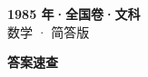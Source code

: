 \documentclass[zihao=-4, a4paper]{ctexart}
\begin{document}
\begin{center}
  {\Large\bfseries 1985 年·全国卷·文科}\\[4pt]
  {\large 数学 · 简答版}
\end{center}
\medskip
{}

\clearpage
{}
\begin{center}{\Large\bfseries 答案速查}\end{center}
\medskip

\end{document}
